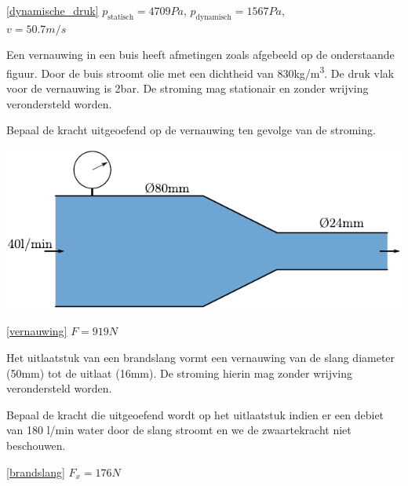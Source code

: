 	\begin{antwoord}{\ref{dynamische_druk}}
		$p_{\text{statisch}} = 4709\unit{Pa}$, $p_{\text{dynamisch}} = 1567\unit{Pa}$,\\ $v = 50.7\unit{m/s}$
	\end{antwoord}
	\begin{toepassing}
		\label{vernauwing}
Een vernauwing in een buis heeft afmetingen zoals afgebeeld op de onderstaande figuur. Door de buis stroomt olie met een dichtheid van 830\unit{kg/m^3}. De druk vlak voor de vernauwing is 2\unit{bar}. De stroming mag stationair en zonder wrijving verondersteld worden.
		
Bepaal de kracht uitgeoefend op de vernauwing ten gevolge van de stroming.
		\begin{center}
			\includegraphics{fig/behoudsvergelijkingen/vernauwing}
		\end{center}
	\end{toepassing}
	\begin{antwoord}{\ref{vernauwing}}
		$F = 919\unit{N}$
	\end{antwoord}
	\begin{toepassing}[*]
		\label{brandslang}
Het uitlaatstuk van een brandslang vormt een vernauwing van de slang diameter (50mm) tot de uitlaat (16mm). De stroming hierin mag zonder wrijving verondersteld worden.

Bepaal de kracht die uitgeoefend wordt op het uitlaatstuk indien er een debiet van 180 l/min water door de slang stroomt en we de zwaartekracht niet beschouwen.

\centering
	\end{toepassing}
	\begin{antwoord}{\ref{brandslang}}
		$F_x = 176\unit{N}$
	\end{antwoord}
